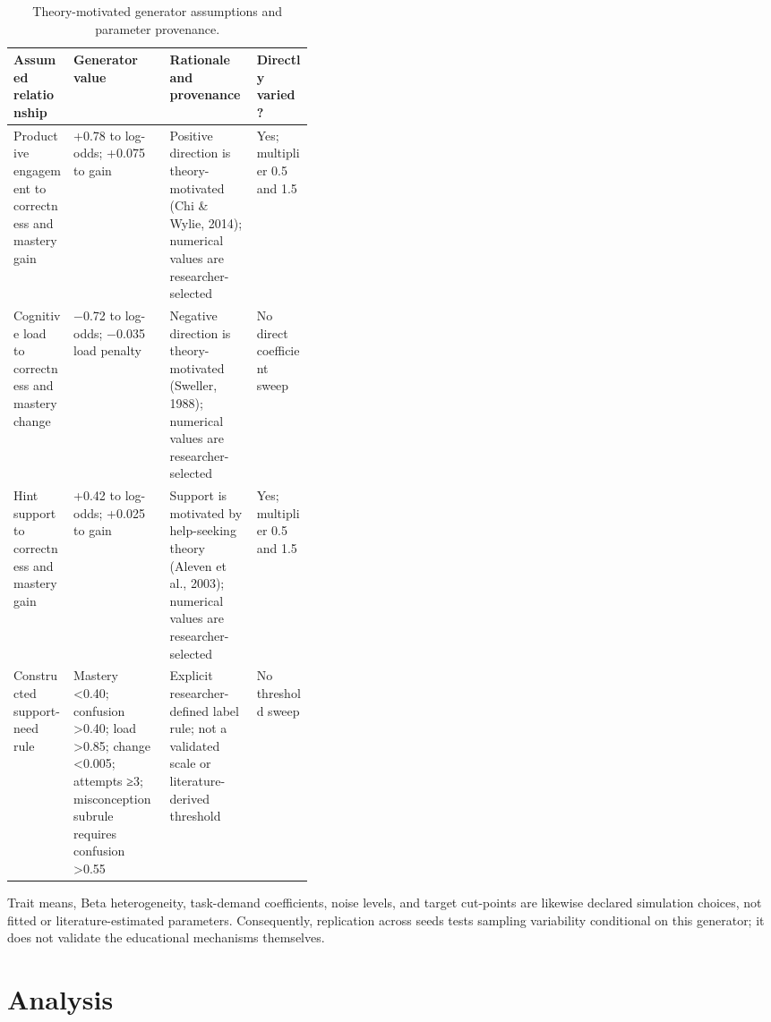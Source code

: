 \documentclass[11pt]{article}
\begin{document}
\begin{table}[htbp]
\centering\small
\caption{Theory-motivated generator assumptions and parameter provenance.}
\label{tab:assumptions}
\begin{tabularx}{\linewidth}{@{}>{\raggedright\arraybackslash}p{0.2\linewidth}>{\raggedright\arraybackslash}X>{\raggedright\arraybackslash}X>{\raggedright\arraybackslash}p{0.19\linewidth}@{}}
\toprule
\textbf{Assumed relationship} & \textbf{Generator value} & \textbf{Rationale and provenance} & \textbf{Directly varied?} \\
\midrule
Productive engagement to correctness and mastery gain & +0.78 to log-odds; +0.075 to gain & Positive direction is theory-motivated (Chi \& Wylie, 2014); numerical values are researcher-selected & Yes; multiplier 0.5 and 1.5 \\
\addlinespace
Cognitive load to correctness and mastery change & −0.72 to log-odds; −0.035 load penalty & Negative direction is theory-motivated (Sweller, 1988); numerical values are researcher-selected & No direct coefficient sweep \\
\addlinespace
Hint support to correctness and mastery gain & +0.42 to log-odds; +0.025 to gain & Support is motivated by help-seeking theory (Aleven et al., 2003); numerical values are researcher-selected & Yes; multiplier 0.5 and 1.5 \\
\addlinespace
Constructed support-need rule & Mastery <0.40; confusion >0.40; load >0.85; change <0.005; attempts ≥3; misconception subrule requires confusion >0.55 & Explicit researcher-defined label rule; not a validated scale or literature-derived threshold & No threshold sweep \\
\bottomrule
\end{tabularx}
\end{table}

Trait means, Beta heterogeneity, task-demand coefficients, noise levels, and target cut-points are likewise declared simulation choices, not fitted or literature-estimated parameters. Consequently, replication across seeds tests sampling variability conditional on this generator; it does not validate the educational mechanisms themselves.

\section{Analysis}
\end{document}
